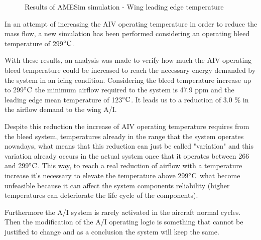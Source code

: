 \begin{figure}[H] %
    \caption{Results of AMESim simulation - Wing leading edge temperature}
    \label{fig:ResAMESimWingLeadEdge}
\end{figure}

In an attempt of increasing the AIV operating temperature in order to reduce the mass flow, a new simulation has been performed considering an operating bleed temperature of 299$\celsius$.

With these results, an analysis was made to verify how much the AIV operating bleed temperature could be increased to reach the necessary energy demanded by the system in an icing condition. Considering the bleed temperature increase up to 299$\celsius$  the minimum airflow required to the system is 47.9 ppm and the leading edge mean temperature of 123$\celsius$. It leads us to a reduction of 3.0 \% in the airflow demand to the wing A/I.

Despite this reduction the increase of AIV operating temperature requires from the bleed system, temperatures already in the range that the system operates nowadays, what means that this reduction can just be called "variation" and this variation already occurs in the actual system once that it operates between 266 and 299$\celsius$. This way, to reach a real reduction of airflow with a temperature increase it's necessary to elevate the temperature above 299$\celsius$  what become unfeasible because it can affect the system components reliability (higher temperatures can deteriorate the life cycle of the components).

Furthermore the A/I system is rarely activated in the aircraft normal cycles. Then the modification of the A/I operating logic is something that cannot be justified to change and as a conclusion the system will keep the same. 